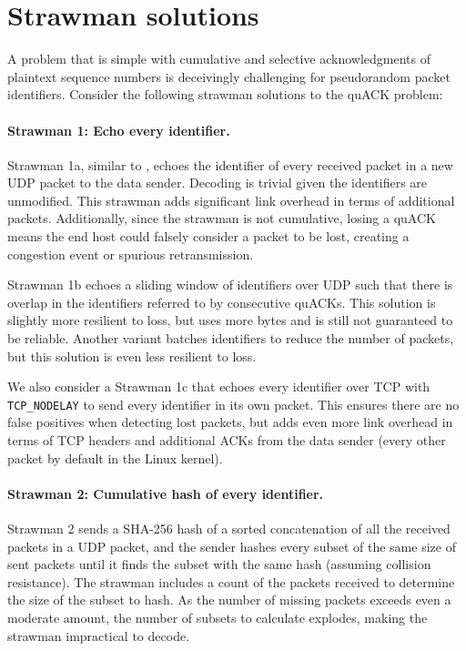 \section{Strawman solutions}
\label{sec:quack:strawmen}



A problem that is simple with cumulative and selective acknowledgments of
plaintext sequence numbers is deceivingly challenging for pseudorandom
packet identifiers. Consider the following strawman solutions to the quACK
problem:

\paragraph{Strawman 1: Echo every identifier.}
Strawman 1a, similar to \cite{li-tsvwg-loops-problem-opportunities-06,kramer2020lwpep},
echoes the identifier of every received packet in a new UDP packet to the data
sender.  Decoding is trivial given the identifiers are unmodified.
This strawman adds significant link overhead in terms of additional packets.
Additionally, since the strawman is not cumulative, losing a quACK means the
end host could falsely consider a packet to be lost, creating a congestion
event or spurious retransmission.

Strawman 1b echoes a sliding window of identifiers over UDP such that there is overlap
in the identifiers referred to by consecutive quACKs.
This solution is slightly more resilient to loss, but uses more bytes and is
still not guaranteed to be reliable.
Another variant batches identifiers to reduce the number of packets, but this
solution is even less resilient to loss.

We also consider a Strawman 1c that echoes every identifier over TCP with
\texttt{TCP\_NODELAY} to send every identifier in its own packet.
This ensures there are no false positives when detecting lost packets,
but adds even more link overhead in terms of TCP headers and additional ACKs
from the data sender (every other packet by default in the Linux kernel).

\paragraph{Strawman 2: Cumulative hash of every identifier.}
Strawman 2 sends a SHA-256 hash of a sorted concatenation of all the
received packets in a UDP packet, and the sender hashes every subset of the same size of
sent packets until it finds the subset with the same hash (assuming collision resistance).
The strawman includes
a count of the packets received to determine the size of the subset to hash.
As the number of missing packets exceeds even a moderate amount, the number
of subsets to calculate explodes, making the strawman impractical to decode.

